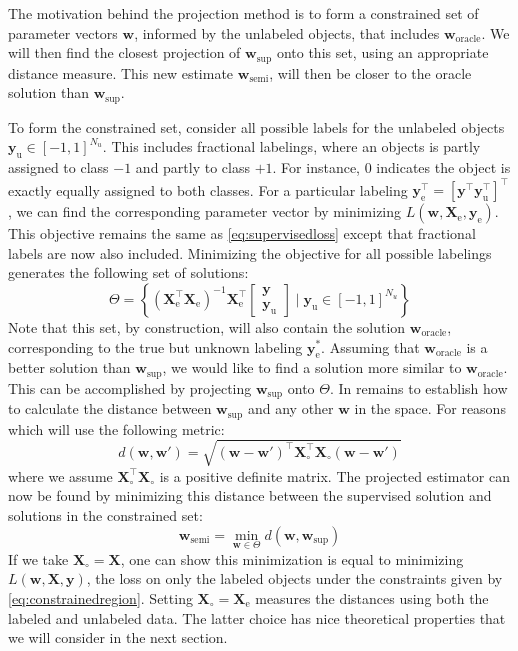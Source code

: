 \documentclass{article}
\newcommand{\Xe}{\vec{X}_\mathrm{e}  }
\newcommand{\XeT}{\vec{X}_\mathrm{e}^\top}
\newcommand{\ye}{\begin{bmatrix} \vec{y}  \\ \vec{y}_\mathrm{u} \end{bmatrix}}
\newcommand{\G}{\left(\Xe^\top \Xe \right)^{-1}}
\renewcommand{\vec}[1]{\mathbf{#1}}
\begin{document}
The motivation behind the projection method is to form a constrained set of parameter vectors $\vec{w}$, informed by the unlabeled objects, that includes $\vec{w}_\text{oracle}$. We will then find the closest projection of $\vec{w}_{\text{sup}}$ onto this set, using an appropriate distance measure. This new estimate $\vec{w}_{\text{semi}}$, will then be closer to the oracle solution than $\vec{w}_{\text{sup}}$. 

To form the constrained set, consider all possible labels for the unlabeled objects $\vec{y}_\text{u} \in [-1,1]^{N_u}$. This includes fractional labelings, where an objects is partly assigned to class $-1$ and partly to class $+1$. For instance, $0$ indicates the object is exactly equally assigned to both classes. For a particular labeling $\vec{y}_\text{e}^\top = \left[ \vec{y}^\top \vec{y}_\text{u}^\top \right]^\top$, we can find the corresponding parameter vector by minimizing $L(\vec{w},\vec{X}_\text{e},\vec{y}_\text{e})$.
This objective remains the same as \eqref{eq:supervisedloss} except that fractional labels are now also included. Minimizing the objective for all possible labelings generates the following set of solutions:
\begin{equation}
\label{eq:constrainedregion}
\Theta=\left\{ \G \XeT \ye \mid \vec{y}_\text{u} \in [-1,1]^{N_u} \right\}
\end{equation}
Note that this set, by construction, will also contain the solution $\vec{w}_\text{oracle}$, corresponding to the true but unknown labeling $\vec{y}_\text{e}^{\ast}$. Assuming that $\vec{w}_\text{oracle}$ is a better solution than $\vec{w}_\text{sup}$, we would like to find a solution more similar to $\vec{w}_\text{oracle}$. This can be accomplished by projecting $\vec{w}_\text{sup}$ onto $\Theta$. In remains to establish how to calculate the distance between $\vec{w}_\text{sup}$ and any other $\vec{w}$ in the space. For reasons which will use the following metric:
\begin{equation}
\label{eq:metric}
d(\vec{w},\vec{w}\prime)=\sqrt{\left( \vec{w}-\vec{w}\prime \right)^\top \vec{X}_{\circ}^\top \vec{X}_{\circ}  \left( \vec{w}-\vec{w}\prime \right)}
\end{equation}
where we assume $\vec{X}_{\circ}^\top \vec{X}_{\circ}$ is a positive definite matrix. The projected estimator can now be found by minimizing this distance between the supervised solution and solutions in the constrained set:
\begin{equation}
\label{eq:projection}
\vec{w}_\mathrm{semi} = \min_{\vec{w} \in \Theta} d(\vec{w},\vec{w}_\text{sup})
\end{equation}
If we take $\vec{X}_{\circ}=\vec{X}$, one can show this minimization is equal to minimizing $L(\vec{w},\vec{X},\vec{y})$, the loss on only the labeled objects under the constraints given by \eqref{eq:constrainedregion}. Setting $\vec{X}_\circ=\Xe$ measures the distances using both the labeled and unlabeled data. The latter choice has nice theoretical properties that we will consider in the next section.
\end{document}
